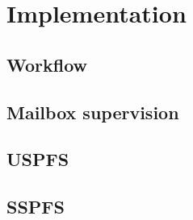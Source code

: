 %
\chapter{Implementation}
\label{cha:implementation}

\section{Workflow}
\label{sec:workflow}

\section{Mailbox supervision}
\label{sec:mailbox-supervision}

\section{USPFS}
\label{sec:uspfs-implem}

\section{SSPFS}
\label{sec:uspfs-implem}


